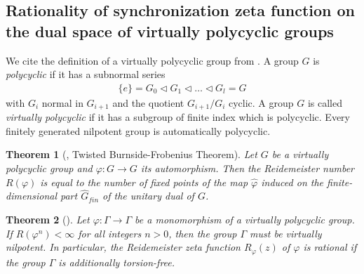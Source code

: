 \documentclass[oneside]{amsart}
\newtheorem{thm}{Theorem}
\begin{document}
\subsection{Rationality of synchronization zeta function on the dual space of virtually polycyclic groups}
We cite the definition of a virtually polycyclic group from \cite{Dere}.
A group $G$ is \emph{polycyclic} if it has a subnormal series
\begin{align*}
  \{ e \} = G_0 \vartriangleleft G_1 \vartriangleleft \dots \vartriangleleft G_l = G
\end{align*}
with $G_i$ normal in $G_{i+1}$ and the quotient $G_{i+1}/G_i$ cyclic.
A group $G$ is called \emph{virtually polycyclic} if it has a subgroup of finite index which is polycyclic.
Every finitely generated nilpotent group is automatically polycyclic.

\begin{thm}[, Twisted Burnside-Frobenius Theorem] \label{thm:FelTro-7.8}
  Let $G$ be a virtually polycyclic group and $\varphi: G \to G$ its automorphism.
  Then the Reidemeister number $R(\varphi)$ is equal to the number of fixed points
  of the map $\widehat{\varphi}$ induced on the finite-dimensional part $\widehat{G}_{fin}$
  of the unitary dual of $G$.
\end{thm}

\begin{thm}[] \label{thm:Dere-3.12}
  Let $\varphi: \Gamma \to \Gamma$ be a monomorphism of a virtually polycyclic group.
  If $R(\varphi^n) < \infty$ for all integers $n>0$, then the group $\Gamma$ must be virtually nilpotent.
  In particular, the Reidemeister zeta function $R_\varphi(z)$ of $\varphi$ is rational
  if the group $\Gamma$ is additionally torsion-free.
\end{thm}
\end{document}
